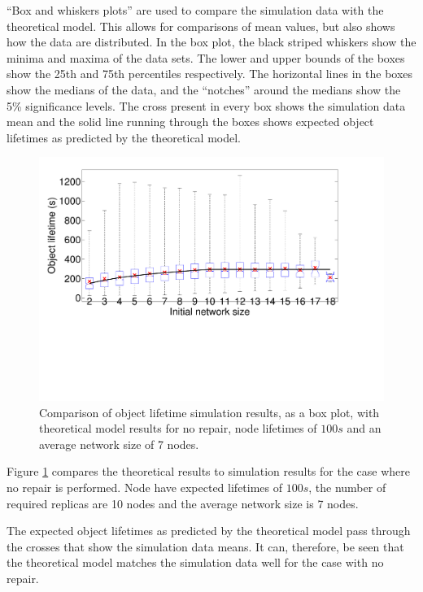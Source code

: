 \documentclass[10pt,a4paper,conference]{IEEEtran}
\begin{document}
``Box and whiskers plots'' are used to compare the simulation data with the theoretical model. This allows for comparisons of mean values, but also shows how the data are distributed. In the box plot, the black striped whiskers show the minima and maxima of the data sets. The lower and upper bounds of the boxes show the 25th and 75th percentiles respectively. The horizontal lines in the boxes show the medians of the data, and the ``notches'' around the medians show the 5\% significance levels. The cross present in every box shows the simulation data mean and the solid line running through the boxes shows expected object lifetimes as predicted by the theoretical model.

\begin{figure}[htbp]
 \centering
 \includegraphics[clip=true, viewport=0.5cm 7.0cm 26.0cm 20.0cm, width=\columnwidth]{lifetime_simulation_model_none_100}
 \caption{Comparison of object lifetime simulation results, as a box plot, with theoretical model results for no repair, node lifetimes of $100 s$ and an average network size of 7 nodes.}
 \label{fig_lifetime_simulation_model_none_100}
\end{figure}
%
Figure \ref{fig_lifetime_simulation_model_none_100} compares the theoretical results to simulation results for the case where no repair is performed. Node have expected lifetimes of $100 s$, the number of required replicas are 10 nodes and the average network size is 7 nodes.

The expected object lifetimes as predicted by the theoretical model pass through the crosses that show the simulation data means. It can, therefore, be seen that the theoretical model matches the simulation data well for the case with no repair.
\end{document}
